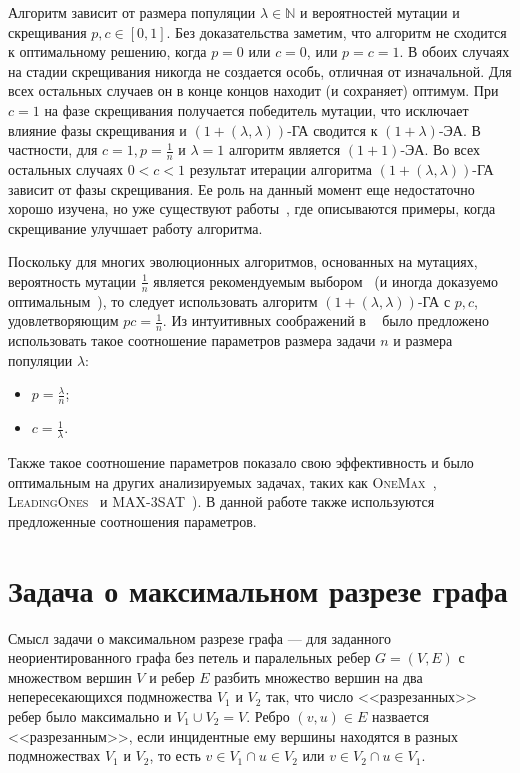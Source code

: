 \documentclass[times]{itmo-student-thesis}
\newcommand{\alglambdaf}{${(1 + (\lambda , \lambda))}$-ГА\xspace}
\newcommand{\oea}{\mbox{$(1 + 1)$-ЭА}\xspace}
\newcommand{\oplea}{\mbox{$(1+\lambda)$-ЭА}\xspace}
\newcommand{\onemax}{\textsc{OneMax}\xspace}
\newcommand{\leadingones}{\textsc{LeadingOnes}\xspace}
\newcommand{\N}{{\mathbb N}}
\begin{document}
Алгоритм зависит от размера популяции $\lambda \in \N$ и вероятностей мутации и скрещивания $p, c \in [0, 1]$.
Без доказательства заметим, что алгоритм не сходится к оптимальному решению, когда $p = 0$ или $c = 0$, или $p = c = 1$. В обоих случаях на стадии скрещивания никогда не создается особь, отличная от изначальной.
Для всех остальных случаев он в конце концов находит (и сохраняет) оптимум.
При $c = 1$ на фазе скрещивания получается победитель мутации, что исключает влияние фазы скрещивания и \alglambdaf сводится к \oplea.
В частности, для $c = 1, p = \frac{1}{n}$ и $\lambda = 1$ алгоритм является \oea.
Во всех остальных случаях $0 < c < 1$ результат итерации алгоритма \alglambdaf зависит от фазы скрещивания.
Ее роль на данный момент еще недостаточно хорошо изучена, но уже существуют работы~\cite{Crossover2008, Dirk2014, Dang16, DoerrG09}, где описываются примеры, когда скрещивание улучшает работу алгоритма.

Поскольку для многих эволюционных алгоритмов, основанных на мутациях, вероятность мутации $\frac{1}{n}$ является рекомендуемым выбором~\cite{DoerrDE15} (и иногда доказуемо  оптимальным~\cite{Cambridge2013}), то следует использовать алгоритм \alglambdaf с $p, c$, удовлетворяющим $pc = \frac{1}{n}$.
Из интуитивных соображений в ~\cite{DoerrDE15} было предложено использовать такое соотношение параметров размера задачи $n$ и размера популяции $\lambda$:
\begin{itemize}
 \item $p = \frac{\lambda}{n}$;
 \item $c = \frac{1}{\lambda}$.
 \end{itemize}
Также такое соотношение параметров показало свою эффективность и было оптимальным на других анализируемых задачах, таких как \onemax~\cite{DoerrDE15}, \leadingones~\cite{AntipovDK19} и MAX-3SAT~\cite{BuzdalovD17}). В данной работе также используются предложенные соотношения параметров.


\section{Задача о максимальном разрезе графа}

Смысл задачи о максимальном разрезе графа --- для заданного неориентированного графа без петель и паралельных ребер $G = (V, E)$ с множеством вершин $V$ и ребер $E$ разбить множество вершин на два непересекающихся подмножества $V_1$ и $V_2$ так, что число <<разрезанных>> ребер было максимально и $V_1 \cup V_2 = V$.
 Ребро $(v, u) \in E$ назвается <<разрезанным>>, если инцидентные ему вершины находятся в разных подмножествах $V_1$ и $V_2$, то есть $v \in V_1 \cap u \in V_2$ или $v \in V_2 \cap u \in V_1$.
\end{document}
